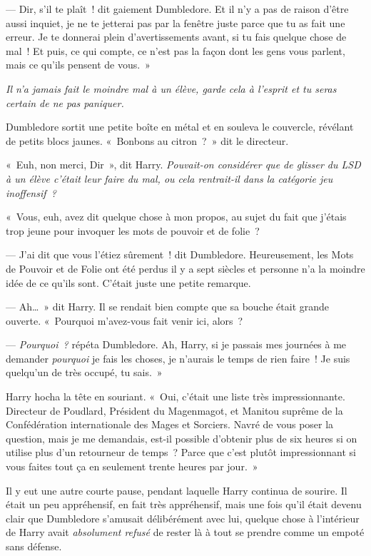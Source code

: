 --- Dir, s'il te plaît~! dit gaiement Dumbledore. Et il n'y a pas de raison d'être aussi inquiet, je ne te jetterai pas par la fenêtre juste parce que tu as fait une erreur. Je te donnerai plein d'avertissements avant, si tu fais quelque chose de mal~! Et puis, ce qui compte, ce n'est pas la façon dont les gens vous parlent, mais ce qu'ils pensent de vous.~»

\emph{Il n'a jamais fait le moindre mal à un élève, garde cela à l'esprit et tu seras certain de ne pas paniquer.}

Dumbledore sortit une petite boîte en métal et en souleva le couvercle, révélant de petits blocs jaunes. «~Bonbons au citron~?~» dit le directeur.

«~Euh, non merci, Dir~», dit Harry. \emph{Pouvait-on considérer que de glisser du LSD à un élève c'était leur faire du mal, ou cela rentrait-il dans la catégorie jeu inoffensif~?}

«~Vous, euh, avez dit quelque chose à mon propos, au sujet du fait que j'étais trop jeune pour invoquer les mots de pouvoir et de folie~?

--- J'ai dit que vous l'étiez sûrement~! dit Dumbledore. Heureusement, les Mots de Pouvoir et de Folie ont été perdus il y a sept siècles et personne n'a la moindre idée de ce qu'ils sont. C'était juste une petite remarque.

--- Ah…~» dit Harry. Il se rendait bien compte que sa bouche était grande ouverte. «~Pourquoi m'avez-vous fait venir ici, alors~?

--- \emph{Pourquoi~?} répéta Dumbledore. Ah, Harry, si je passais mes journées à me demander \emph{pourquoi} je fais les choses, je n'aurais le temps de rien faire~! Je suis quelqu'un de très occupé, tu sais.~»

Harry hocha la tête en souriant. «~Oui, c'était une liste très impressionnante. Directeur de Poudlard, Président du Magenmagot, et Manitou suprême de la Confédération internationale des Mages et Sorciers. Navré de vous poser la question, mais je me demandais, est-il possible d'obtenir plus de six heures si on utilise plus d'un retourneur de temps~? Parce que c'est plutôt impressionnant si vous faites tout ça en seulement trente heures par jour.~»

Il y eut une autre courte pause, pendant laquelle Harry continua de sourire. Il était un peu appréhensif, en fait très appréhensif, mais une fois qu'il était devenu clair que Dumbledore s'amusait délibérément avec lui, quelque chose à l'intérieur de Harry avait \emph{absolument refusé} de rester là à tout se prendre comme un empoté sans défense.

